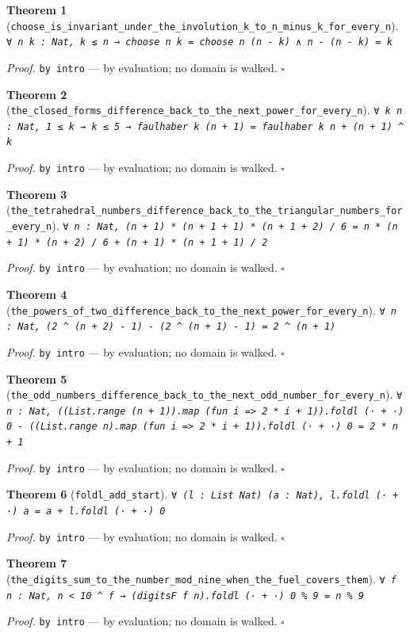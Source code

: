 \documentclass[11pt]{article}
\newtheorem{theorem}{Theorem}[section]
\begin{document}
\begin{theorem}[\texttt{choose\_is\_invariant\_under\_the\_involution\_k\_to\_n\_minus\_k\_for\_every\_n}]
\texttt{∀ n k : Nat, k ≤ n → choose n k = choose n (n - k) ∧ n - (n - k) = k}
\end{theorem}
\noindent\emph{Proof.} \texttt{by
  intro} --- by evaluation; no domain is walked. \hfill$\square$

\begin{theorem}[\texttt{the\_closed\_forms\_difference\_back\_to\_the\_next\_power\_for\_every\_n}]
\texttt{∀ k n : Nat, 1 ≤ k → k ≤ 5 → faulhaber k (n + 1) = faulhaber k n + (n + 1) ^ k}
\end{theorem}
\noindent\emph{Proof.} \texttt{by
  intro} --- by evaluation; no domain is walked. \hfill$\square$

\begin{theorem}[\texttt{the\_tetrahedral\_numbers\_difference\_back\_to\_the\_triangular\_numbers\_for\_every\_n}]
\texttt{∀ n : Nat, (n + 1) * (n + 1 + 1) * (n + 1 + 2) / 6 = n * (n + 1) * (n + 2) / 6 + (n + 1) * (n + 1 + 1) / 2}
\end{theorem}
\noindent\emph{Proof.} \texttt{by
  intro} --- by evaluation; no domain is walked. \hfill$\square$

\begin{theorem}[\texttt{the\_powers\_of\_two\_difference\_back\_to\_the\_next\_power\_for\_every\_n}]
\texttt{∀ n : Nat, (2 ^ (n + 2) - 1) - (2 ^ (n + 1) - 1) = 2 ^ (n + 1)}
\end{theorem}
\noindent\emph{Proof.} \texttt{by
  intro} --- by evaluation; no domain is walked. \hfill$\square$

\begin{theorem}[\texttt{the\_odd\_numbers\_difference\_back\_to\_the\_next\_odd\_number\_for\_every\_n}]
\texttt{∀ n : Nat, ((List.range (n + 1)).map (fun i => 2 * i + 1)).foldl (· + ·) 0 - ((List.range n).map (fun i => 2 * i + 1)).foldl (· + ·) 0 = 2 * n + 1}
\end{theorem}
\noindent\emph{Proof.} \texttt{by
  intro} --- by evaluation; no domain is walked. \hfill$\square$

\begin{theorem}[\texttt{foldl\_add\_start}]
\texttt{∀ (l : List Nat) (a : Nat), l.foldl (· + ·) a = a + l.foldl (· + ·) 0}
\end{theorem}
\noindent\emph{Proof.} \texttt{by
  intro} --- by evaluation; no domain is walked. \hfill$\square$

\begin{theorem}[\texttt{the\_digits\_sum\_to\_the\_number\_mod\_nine\_when\_the\_fuel\_covers\_them}]
\texttt{∀ f n : Nat, n < 10 ^ f → (digitsF f n).foldl (· + ·) 0 \% 9 = n \% 9}
\end{theorem}
\noindent\emph{Proof.} \texttt{by
  intro} --- by evaluation; no domain is walked. \hfill$\square$
\end{document}
